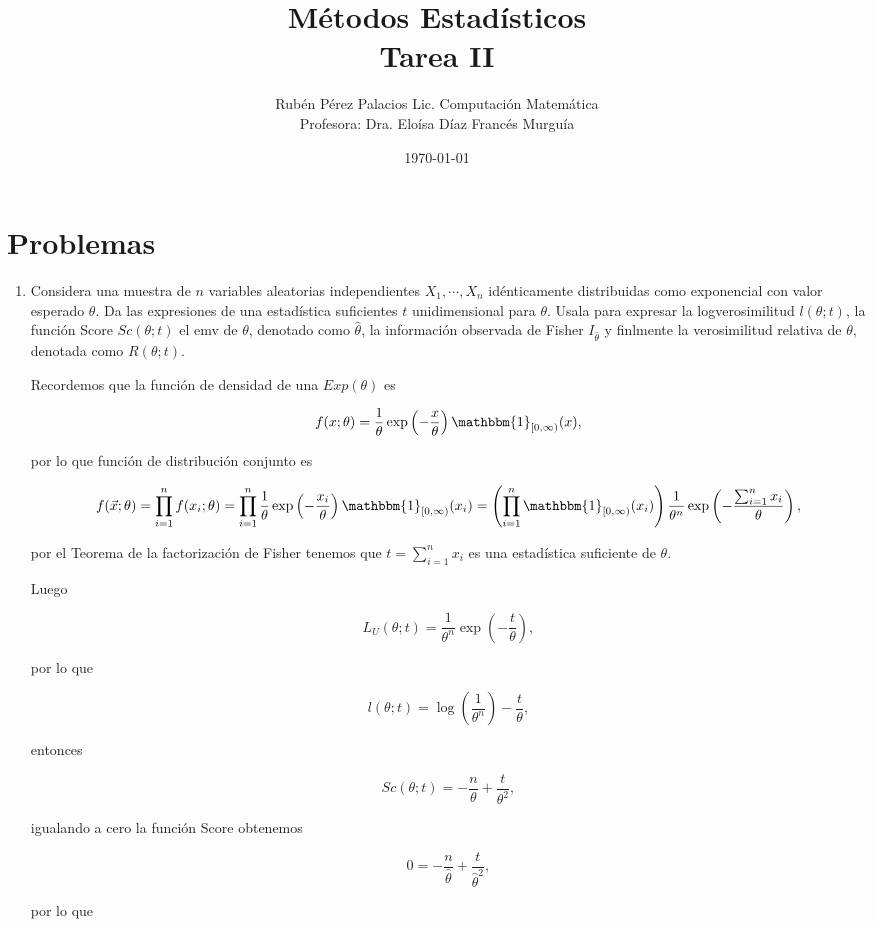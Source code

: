 \documentclass[letterpaper]{article}
\title{Métodos Estadísticos \\Tarea II}
\author{Rubén Pérez Palacios Lic. Computación Matemática\\Profesora: Dra. Eloísa Díaz Francés Murguía}
\date{\today}
\theoremstyle{definition}
\theoremstyle{lemathm}
\theoremstyle{lemathm}
\theoremstyle{lemathm}
\theoremstyle{lemademthm}
\newcommand{\pars}[1]{\left( #1 \right) }
\newcommand{\1}{\mathbbm{1}}
\begin{document}
	\maketitle
    
    \section*{Problemas}

	\begin{enumerate}
		\item Considera una muestra de $n$ variables aleatorias independientes $X_1,\cdots,X_n$ idénticamente distribuidas como exponencial con valor esperado $\theta$. Da las expresiones de una estadística suficientes $t$ unidimensional para $\theta$. Usala para expresar la logverosimilitud $l\pars{\theta;t}$, la función Score $Sc(\theta;t)$ el emv de $\theta$, denotado como $\hat{\theta}$, la información observada de Fisher $I_{\hat{\theta}}$ y finlmente la verosimilitud relativa de $\theta$, denotada como $R(\theta;t)$.
		
		Recordemos que la función de densidad de una $Exp(\theta)$ es

		\[f(x;\theta) = \frac{1}{\theta}\exp\pars{-\frac{x}{\theta}}\1_{\left[0,\infty\right)}(x),\]

		por lo que función de distribución conjunto es

		\[f(\vec{x};\theta) = \prod_{i=1}^n f(x_i;\theta) = \prod_{i=1}^n \frac{1}{\theta}\exp\pars{-\frac{x_i}{\theta}}\1_{\left[0,\infty\right)}(x_i) = \pars{\prod_{i=1}^n\1_{\left[0,\infty\right)}(x_i)} \frac{1}{\theta^n} \exp\pars{-\frac{\sum_{i=1}^n x_i}{\theta}},\]

		por el Teorema de la factorización de Fisher tenemos que $t = \sum_{i=1}^n x_i$ es una estadística suficiente de $\theta$.

		Luego

		\[L_U(\theta;t) = \frac{1}{\theta^n}\exp\pars{-\frac{t}{\theta}},\]

		por lo que

		\[l(\theta;t) = \log\pars{\frac{1}{\theta^n}}-\frac{t}{\theta},\]

		entonces

		\[Sc(\theta;t) = -\frac{n}{\theta}+\frac{t}{\theta^2},\]

		igualando a cero la función Score obtenemos

		\[0 = -\frac{n}{\hat{\theta}}+\frac{t}{\hat{\theta}^2},\]

		por lo que


\end{enumerate}
\end{document}
